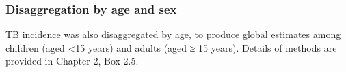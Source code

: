 \subsubsection{Disaggregation by age and sex}

TB incidence was also disaggregated by age, to produce global estimates among children (aged <15 years) and adults (aged ≥ 15 years). Details of methods are provided in Chapter 2, Box 2.5.  

